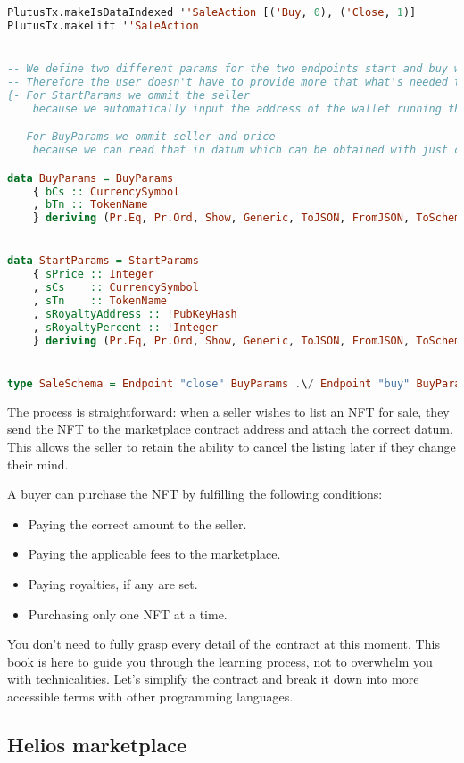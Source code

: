 \begin{lstlisting}[language=haskell, caption=Types Code for Marketplace Contract]
PlutusTx.makeIsDataIndexed ''SaleAction [('Buy, 0), ('Close, 1)]
PlutusTx.makeLift ''SaleAction


-- We define two different params for the two endpoints start and buy with the minimal info needed.
-- Therefore the user doesn't have to provide more that what's needed to execute the said action.
{- For StartParams we ommit the seller
    because we automatically input the address of the wallet running the startSale enpoint

   For BuyParams we ommit seller and price
    because we can read that in datum which can be obtained with just cs and tn of the sold token -}

data BuyParams = BuyParams
    { bCs :: CurrencySymbol
    , bTn :: TokenName
    } deriving (Pr.Eq, Pr.Ord, Show, Generic, ToJSON, FromJSON, ToSchema)


data StartParams = StartParams
    { sPrice :: Integer
    , sCs    :: CurrencySymbol
    , sTn    :: TokenName
    , sRoyaltyAddress :: !PubKeyHash
    , sRoyaltyPercent :: !Integer
    } deriving (Pr.Eq, Pr.Ord, Show, Generic, ToJSON, FromJSON, ToSchema)


type SaleSchema = Endpoint "close" BuyParams .\/ Endpoint "buy" BuyParams .\/ Endpoint "start" StartParams
\end{lstlisting}
The process is straightforward: when a seller wishes to list an NFT for sale, they send the NFT to the marketplace contract address and attach the correct datum. This allows the seller to retain the ability to cancel the listing later if they change their mind.

A buyer can purchase the NFT by fulfilling the following conditions: 
\begin{itemize}
    \item Paying the correct amount to the seller.
    \item Paying the applicable fees to the marketplace.
    \item Paying royalties, if any are set.
    \item Purchasing only one NFT at a time.
\end{itemize}

You don't need to fully grasp every detail of the contract at this moment. This book is here to guide you through the learning process, not to overwhelm you with technicalities. Let's simplify the contract and break it down into more accessible terms with other programming languages.

\subsection{Helios marketplace}
